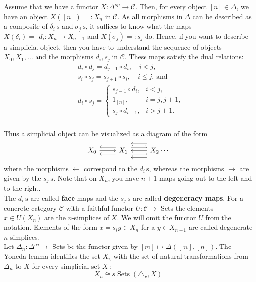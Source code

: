 Assume that we have a functor $X: \Delta^{o p} \rightarrow \mathcal{C}$. Then, for every object $[n] \in \Delta$, we have an object $X([n])=: X_n$ in $\mathcal{C}$. As all morphisms in $\Delta$ can be described as a composite of $\delta_i \mathrm{~s}$ and $\sigma_j \mathrm{~s}$, it suffices to know what the maps $X\left(\delta_i\right)=: d_i: X_n \rightarrow X_{n-1}$ and $X\left(\sigma_j\right)=: s_j$ do. Hence, if you want to describe a simplicial object, then you have to understand the sequence of objects $X_0, X_1, \ldots$ and the morphisms $d_i, s_j$ in $\mathcal{C}$. These maps satisfy the dual relations:
$$
\begin{aligned}
& d_i \circ d_j=d_{j-1} \circ d_i, \quad i<j, \\
& s_i \circ s_j=s_{j+1} \circ s_i, \quad i \leq j \text {, and } \\
& d_i \circ s_j=\left\{\begin{array}{cl}
s_{j-1} \circ d_i, & i<j, \\
1_{[n]}, & i=j, j+1, \\
s_j \circ d_{i-1}, & i>j+1 .
\end{array}\right. \\
&
\end{aligned}
$$

Thus a simplicial object can be visualized as a diagram of the form
$$
\begin{tikzcd}
     X_0 \ar[r] \ar[r, leftarrow, shift left =2] \ar[r, leftarrow, shift right =2] & X_1 \ar[r, leftarrow] \ar[r, leftarrow, shift left =4] \ar[r, leftarrow, shift right =4] \ar[r, shift left =2] \ar[r, shift right =2] & X_2  \cdots
    \end{tikzcd}
$$
where the morphisms $\leftarrow$ correspond to the $d_i \mathrm{~s}$, whereas the morphisms $\rightarrow$ are given by the $s_j \mathrm{~s}$. Note that on $X_n$, you have $n+1$ maps going out to the left and to the right.\\
The $d_i \mathrm{~s}$ are called \textbf{face} maps and the $s_j \mathrm{~s}$ are called \textbf{degeneracy maps}.
For a concrete category $\mathcal{C}$ with a faithful functor $U: \mathcal{C} \rightarrow$ Sets the elements $x \in U\left(X_n\right)$ are the $n$-simplices of $X$. We will omit the functor $U$ from the notation. Elements of the form $x=s_i y \in X_n$ for a $y \in X_{n-1}$ are called degenerate $n$-simplices.\\

Let $\Delta_n: \Delta^{o p} \rightarrow$ Sets be the functor given by $[m] \mapsto \Delta([m],[n])$.
The Yoneda lemma identifies the set $X_n$ with the set of natural transformations from $\Delta_n$ to $X$ for every simplicial set $X$ :
$$
X_n \cong s \operatorname{Sets}\left(\triangle_n, X\right)
$$

